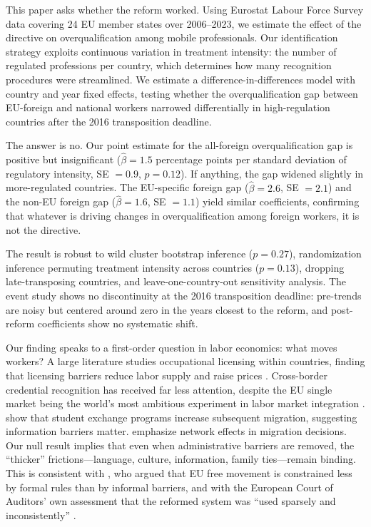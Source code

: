 \documentclass[12pt]{article}
\begin{document}
This paper asks whether the reform worked. Using Eurostat Labour Force Survey data covering 24 EU member states over 2006--2023, we estimate the effect of the directive on overqualification among mobile professionals. Our identification strategy exploits continuous variation in treatment intensity: the number of regulated professions per country, which determines how many recognition procedures were streamlined. We estimate a difference-in-differences model with country and year fixed effects, testing whether the overqualification gap between EU-foreign and national workers narrowed differentially in high-regulation countries after the 2016 transposition deadline.

The answer is no. Our point estimate for the all-foreign overqualification gap is positive but insignificant ($\hat\beta = 1.5$ percentage points per standard deviation of regulatory intensity, SE $= 0.9$, $p = 0.12$). If anything, the gap widened slightly in more-regulated countries. The EU-specific foreign gap ($\hat\beta = 2.6$, SE $= 2.1$) and the non-EU foreign gap ($\hat\beta = 1.6$, SE $= 1.1$) yield similar coefficients, confirming that whatever is driving changes in overqualification among foreign workers, it is not the directive.

The result is robust to wild cluster bootstrap inference ($p = 0.27$), randomization inference permuting treatment intensity across countries ($p = 0.13$), dropping late-transposing countries, and leave-one-country-out sensitivity analysis. The event study shows no discontinuity at the 2016 transposition deadline: pre-trends are noisy but centered around zero in the years closest to the reform, and post-reform coefficients show no systematic shift.

Our finding speaks to a first-order question in labor economics: what moves workers? A large literature studies occupational licensing within countries, finding that licensing barriers reduce labor supply and raise prices \citep{kleiner2006, kleiner2013, blair2019}. Cross-border credential recognition has received far less attention, despite the EU single market being the world's most ambitious experiment in labor market integration \citep{kahanec2013}. \citet{parey2017} show that student exchange programs increase subsequent migration, suggesting information barriers matter. \citet{beine2007} emphasize network effects in migration decisions. Our null result implies that even when administrative barriers are removed, the ``thicker'' frictions---language, culture, information, family ties---remain binding. This is consistent with \citet{guild2014}, who argued that EU free movement is constrained less by formal rules than by informal barriers, and with the European Court of Auditors' own assessment that the reformed system was ``used sparsely and inconsistently'' \citep{eca2024}.
\end{document}
